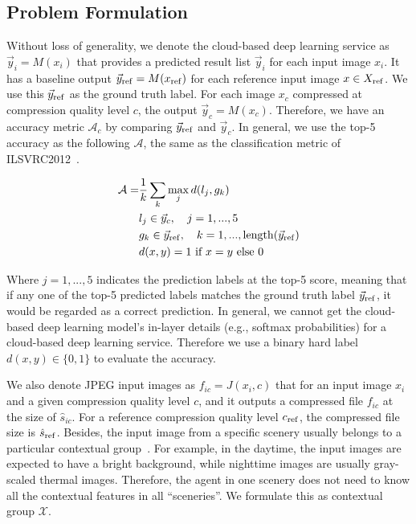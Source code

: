 \subsection{Problem Formulation}
\label{subsec: formulation}

Without loss of generality, we denote the cloud-based deep learning service as $ \vec{y}_i = M(x_i) $ that provides a predicted result list $ \vec{y}_i $ for each input image $ x_i $. It has a baseline output $ \vec{y}_{\rm ref} = M(x_{\rm ref}) $ for each reference input image $ x \in X_{\rm ref} $. We use this $ \vec{y}_{\rm ref} $ as the ground truth label. For each image $ x_c $ compressed at compression quality level $ c $, the output $ \vec{y}_c = M(x_c) $. Therefore, we have an accuracy metric $ \mathcal{A}_c $ by comparing $ \vec{y}_{\rm ref} $ and $ \vec{y}_c $. In general, we use the top-5 accuracy as the following $ \mathcal{A} $, the same as the classification metric of ILSVRC2012~\cite{ILSVRC12}.

\begin{align}
\mathcal{A} =& \frac{1}{k} \sum_{k}\max_jd(l_j, g_k) \\
& l_j \in \vec{y}_c, \quad j=1,...,5 \\
& g_k \in \vec{y}_{\rm ref}, \quad k=1, ..., {\rm length}(\vec{y}_{\rm ref}) \\
& d(x, y) = 1 \ \text{if} \ x=y  \ \text{else} \ 0 
\end{align}

Where $ j = 1,...,5 $ indicates the prediction labels at the top-5 score, meaning that if any one of the top-5 predicted labels matches the ground truth label $ \vec{y}_{\rm ref} $, it would be regarded as a correct prediction. In general, we cannot get the cloud-based deep learning model's in-layer details (e.g., softmax probabilities) for a cloud-based deep learning service. Therefore we use a binary hard label $ d(x, y) \in \{0, 1\} $ to evaluate the accuracy. %

We also denote JPEG input images as $ f_{ic} = J(x_i, c) $ that for an input image $ x_i $ and a given compression quality level $ c $, and it outputs a compressed file $ f_{ic} $ at the size of {\color{revise2} $ \hat{s}_{ic} $}. For a reference compression quality level $ c_{\rm ref} $, the compressed file size is {\color{revise2} $ \hat{s}_{\rm ref} $}. Besides, the input image from a specific scenery usually belongs to a particular contextual group~\cite{mcdnn}. For example, in the daytime, the input images are expected to have a bright background, while nighttime images are usually gray-scaled thermal images. Therefore, the agent in one scenery does not need to know all the contextual features in all ``sceneries''. We formulate this as contextual group $ \mathcal{X} $.

